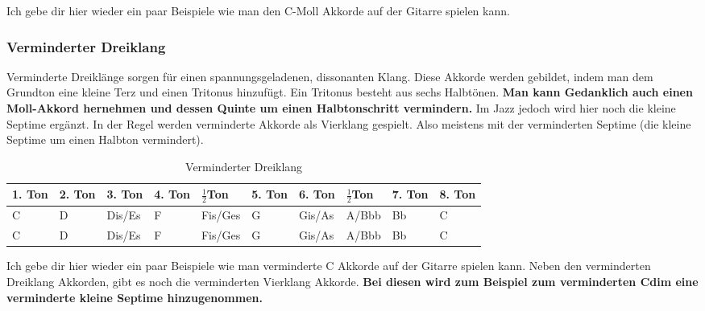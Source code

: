 Ich gebe dir hier wieder ein paar Beispiele wie man den C-Moll Akkorde auf der Gitarre spielen kann.


\subsubsection*{Verminderter Dreiklang}
Verminderte Dreiklänge sorgen für einen spannungsgeladenen, dissonanten Klang. Diese Akkorde werden gebildet, indem man dem Grundton eine kleine Terz und einen Tritonus hinzufügt. Ein Tritonus besteht aus sechs Halbtönen. \textbf{Man kann Gedanklich auch einen Moll-Akkord hernehmen und dessen Quinte um einen Halbtonschritt vermindern.} Im Jazz jedoch wird hier noch die kleine Septime ergänzt. In der Regel werden verminderte Akkorde als Vierklang gespielt. Also meistens mit der verminderten Septime (die kleine Septime um einen Halbton vermindert).

\begin{table}[H]
    \caption{Verminderter Dreiklang}
    \scriptsize
    \begin{tabularx}{\textwidth}{|X|X|p{1.4cm}|X|p{1.4cm}|X|p{1.4cm}|p{1.4cm}|X|X|}
    \hline
    1. Ton & 2. Ton & 3. Ton & 4. Ton & $\frac{1}{2}$Ton & 5. Ton & 6. Ton & $\frac{1}{2}$Ton & 7. Ton & 8. Ton \\ \hline
    \cellcolor{gray!25}C & D & \cellcolor{gray!25}Dis/Es & F & \cellcolor{gray!25}Fis/Ges & G & Gis/As & A/Bbb & Bb & C \\ \hline  
    \cellcolor{gray!25}C & D & \cellcolor{gray!25}Dis/Es & F & \cellcolor{gray!25}Fis/Ges & G & Gis/As & \cellcolor{gray!25}A/Bbb & Bb & C \\ \hline  
    \end{tabularx}
\end{table}

Ich gebe dir hier wieder ein paar Beispiele wie man verminderte C Akkorde auf der Gitarre spielen kann. Neben den verminderten Dreiklang Akkorden, gibt es noch die verminderten Vierklang Akkorde. \textbf{Bei diesen wird zum Beispiel zum verminderten Cdim eine verminderte kleine Septime hinzugenommen.}




